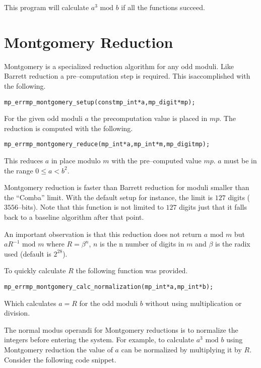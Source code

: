 \documentclass[synpaper]{book}
\begin{document}
This program will calculate $a^3 \mbox{ mod }b$ if all the functions succeed.

\section{Montgomery Reduction}

Montgomery is a specialized reduction algorithm for any odd moduli.  Like Barrett reduction a
pre--computation step is required.  This isaccomplished with the following.

\begin{alltt}
mp_err mp_montgomery_setup(const mp_int *a, mp_digit *mp);
\end{alltt}

For the given odd moduli $a$ the precomputation value is placed in $mp$.  The reduction is computed
with the following.

\begin{alltt}
mp_err mp_montgomery_reduce(mp_int *a, mp_int *m, mp_digit mp);
\end{alltt}
This reduces $a$ in place modulo $m$ with the pre--computed value $mp$.   $a$ must be in the range
$0 \le a < b^2$.

Montgomery reduction is faster than Barrett reduction for moduli smaller than the ``Comba'' limit.
With the default setup for instance, the limit is $127$ digits ($3556$--bits). Note that this
function is not limited to $127$ digits just that it falls back to a baseline algorithm after that
point.

An important observation is that this reduction does not return $a \mbox{ mod }m$ but $aR^{-1}
  \mbox{ mod }m$ where $R = \beta^n$, $n$ is the n number of digits in $m$ and $\beta$ is the radix
used (default is $2^{28}$).

To quickly calculate $R$ the following function was provided.

\begin{alltt}
mp_err mp_montgomery_calc_normalization(mp_int *a, mp_int *b);
\end{alltt}
Which calculates $a = R$ for the odd moduli $b$ without using multiplication or division.

The normal modus operandi for Montgomery reductions is to normalize the integers before entering
the system.  For example, to calculate $a^3 \mbox { mod }b$ using Montgomery reduction the value of
$a$ can be normalized by multiplying it by $R$. Consider the following code snippet.
\end{document}
